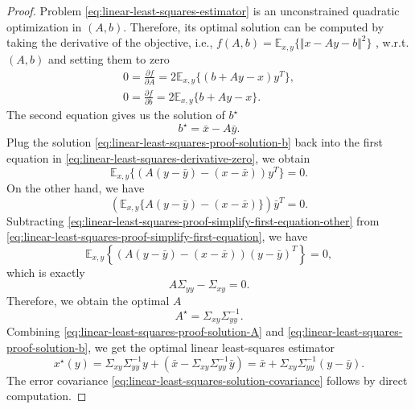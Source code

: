 \documentclass[
]{book}
\theoremstyle{definition}
\theoremstyle{definition}
\theoremstyle{definition}
\theoremstyle{definition}
\theoremstyle{remark}
\begin{document}
\begin{proof}
Problem \eqref{eq:linear-least-squares-estimator} is an unconstrained quadratic optimization in \((A,b)\). Therefore, its optimal solution can be computed by taking the derivative of the objective, i.e., \(f(A,b) = \mathbb{E}_{x,y} \{ \Vert x - Ay - b \Vert^2 \}\) , w.r.t. \((A,b)\) and setting them to zero
\begin{equation}
\begin{split}
0 = \frac{\partial f}{\partial A} = 2 \mathbb{E}_{x,y} \{ (b + Ay -x) y^T \}, \\
0 = \frac{\partial f}{\partial b} = 2 \mathbb{E}_{x,y} \{ b + Ay - x \}.
\end{split}
\label{eq:linear-least-squares-derivative-zero}
\end{equation}
The second equation gives us the solution of \(b^\star\)
\begin{equation}
b^\star = \bar{x} - A \bar{y}.
\label{eq:linear-least-squares-proof-solution-b}
\end{equation}
Plug the solution \eqref{eq:linear-least-squares-proof-solution-b} back into the first equation in \eqref{eq:linear-least-squares-derivative-zero}, we obtain
\begin{equation}
\mathbb{E}_{x,y} \{ (A(y - \bar{y}) - (x - \bar{x})) y^T\} = 0.
\label{eq:linear-least-squares-proof-simplify-first-equation}
\end{equation}
On the other hand, we have
\begin{equation}
\left( \mathbb{E}_{x,y} \{ A (y - \bar{y}) - (x - \bar{x})\} \right) \bar{y}^T = 0.
\label{eq:linear-least-squares-proof-simplify-first-equation-other}
\end{equation}
Subtracting \eqref{eq:linear-least-squares-proof-simplify-first-equation-other} from \eqref{eq:linear-least-squares-proof-simplify-first-equation}, we have
\[
\mathbb{E}_{x,y} \left\{ (A(y-\bar{y}) - (x - \bar{x})) (y - \bar{y})^T \right\} = 0,
\]
which is exactly
\[
A \Sigma_{yy} - \Sigma_{xy} = 0.
\]
Therefore, we obtain the optimal \(A\)
\begin{equation}
A^\star = \Sigma_{xy} \Sigma^{-1}_{yy}.
\label{eq:linear-least-squares-proof-solution-A}
\end{equation}
Combining \eqref{eq:linear-least-squares-proof-solution-A} and \eqref{eq:linear-least-squares-proof-solution-b}, we get the optimal linear least-squares estimator
\[
x^\star(y) = \Sigma_{xy} \Sigma^{-1}_{yy} y + \left( \bar{x} -  \Sigma_{xy} \Sigma^{-1}_{yy} \bar{y} \right) = \bar{x} + \Sigma_{xy} \Sigma^{-1}_{yy} (y - \bar{y}).
\]
The error covariance \eqref{eq:linear-least-squares-solution-covariance} follows by direct computation.
\end{proof}
\end{document}

